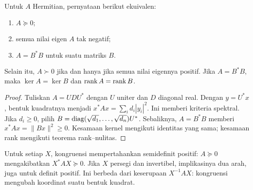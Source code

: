 \begin{teorema}
    Untuk $A$ Hermitian, pernyataan berikut ekuivalen:
    \begin{enumerate}[label=(\roman*),nosep]
        \item $A\succeq0$;
        \item semua nilai eigen $A$ tak negatif;
        \item $A=B^*B$ untuk suatu matriks $B$.
    \end{enumerate}
    Selain itu, $A\succ0$ jika dan hanya jika semua nilai eigennya
    positif. Jika $A=B^*B$, maka $\ker A=\ker B$ dan
    $\operatorname{rank} A=\operatorname{rank} B$.
\end{teorema}
\begin{proof}
    Tuliskan $A=UDU^*$ dengan $U$ uniter dan $D$ diagonal real.
    Dengan $y=U^*x$, bentuk kuadratnya menjadi
    $x^*Ax=\sum_i d_i|y_i|^2$. Ini memberi kriteria spektral.
    Jika $d_i\ge0$, pilih
    $B=\operatorname{diag}(\sqrt{d_1},\ldots,\sqrt{d_n})U^*$.
    Sebaliknya, $A=B^*B$ memberi $x^*Ax=\|Bx\|^2\ge0$.
    Kesamaan kernel mengikuti identitas yang sama; kesamaan rank
    mengikuti teorema rank--nulitas.
\end{proof}

Untuk setiap $X$, kongruensi mempertahankan semidefinit positif:
$A\succeq0$ mengakibatkan $X^*AX\succeq0$.
Jika $X$ persegi dan invertibel, implikasinya dua arah, juga untuk
definit positif. Ini berbeda dari keserupaan $X^{-1}AX$:
kongruensi mengubah koordinat suatu bentuk kuadrat.


